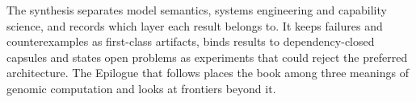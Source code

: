 The synthesis separates model semantics, systems engineering and capability science, and records which layer each result belongs to. It keeps failures and counterexamples as first-class artifacts, binds results to dependency-closed capsules and states open problems as experiments that could reject the preferred architecture. The Epilogue that follows places the book among three meanings of genomic computation and looks at frontiers beyond it.
